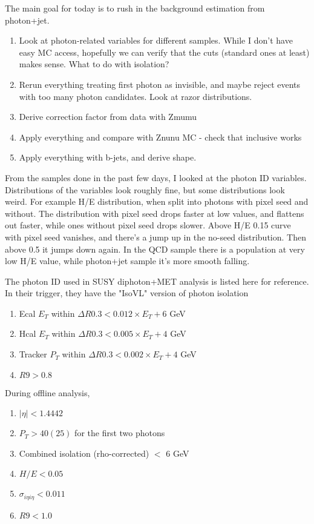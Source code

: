 

The main goal for today is to rush in the background estimation from photon+jet.

\begin{enumerate}
\item Look at photon-related variables for different samples.
While I don't have easy MC access, hopefully we can verify that the cuts
(standard ones at least) makes sense.  What to do with isolation?
\item Rerun everything treating first photon as invisible, and maybe reject events
with too many photon candidates.   Look at razor distributions.
\item Derive correction factor from data with Zmumu
\item Apply everything and compare with Znunu MC - check that inclusive works
\item Apply everything with b-jets, and derive shape.
\end{enumerate}



From the samples done in the past few days, I looked at the photon ID variables.
Distributions of the variables look roughly fine, but some distributions look weird.
For example H/E distribution, when split into photons with pixel seed and without.
The distribution with pixel seed drops faster at low values, and flattens out faster,
while ones without pixel seed drops slower.  Above H/E 0.15 curve with pixel seed
vanishes, and there's a jump up in the no-seed distribution.  Then above 0.5 it
jumps down again.  In the QCD sample there is a population at very low H/E value,
while photon+jet sample it's more smooth falling.

The photon ID used in SUSY diphoton+MET analysis is listed here for reference.
In their trigger, they have the "IsoVL" version of photon isolation

\begin{enumerate}
\item Ecal $E_T$ within $\Delta R 0.3 < 0.012 \times E_T + 6$ GeV
\item Hcal $E_T$ within $\Delta R 0.3 < 0.005 \times E_T + 4$ GeV
\item Tracker $P_T$ within $\Delta R 0.3 < 0.002 \times E_T + 4$ GeV
\item $R9 > 0.8$
\end{enumerate}

During offline analysis,

\begin{enumerate}
\item $|\eta| < 1.4442$
\item $P_T > 40 (25)$ for the first two photons
\item Combined isolation (rho-corrected) $<$ 6 GeV
\item $H/E < 0.05$
\item $\sigma_{i\eta i\eta} < 0.011$
\item $R9 < 1.0$
\end{enumerate}






